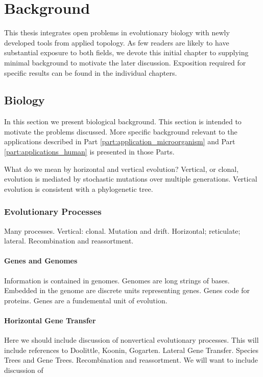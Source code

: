 \chapter{Background}
\label{ch:background}

This thesis integrates open problems in evolutionary biology with newly developed tools from applied topology.
As few readers are likely to have substantial exposure to both fields, we devote this initial chapter to supplying minimal background to motivate the later discussion.
Exposition required for specific results can be found in the individual chapters.

\section{Biology}

In this section we present biological background.
This section is intended to motivate the problems discussed.
More specific background relevant to the applications described in Part \ref{part:application_microorganism} and Part \ref{part:applications_human} is presented in those Parts.

What do we mean by horizontal and vertical evolution?
Vertical, or clonal, evolution is mediated by stochastic mutations over multiple generations.
Vertical evolution is consistent with a phylogenetic tree.

\subsection{Evolutionary Processes}

Many processes.
Vertical: clonal.
Mutation and drift.
Horizontal; reticulate; lateral.
Recombination and reassortment.

\subsubsection{Genes and Genomes}

Information is contained in genomes.
Genomes are long strings of bases.
Embedded in the genome are discrete units representing genes.
Genes code for proteins.
Genes are a fundemental unit of evolution.

\subsubsection{Horizontal Gene Transfer}

Here we should include discussion of nonvertical evolutionary processes.
This will include references to Doolittle, Koonin, Gogarten.
Lateral Gene Transfer.
Species Trees and Gene Trees.
Recombination and reassortment.
We will want to include discussion of 

